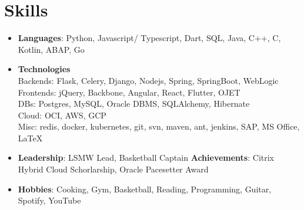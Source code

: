 \documentclass[letterpaper,11pt]{article}
\newcommand{\resumeSubHeadingListStart}{\begin{itemize}[leftmargin=*]}
\newcommand{\resumeSubHeadingListEnd}{\end{itemize}}
\begin{document}
\section{Skills}
 \resumeSubHeadingListStart
 \item{
     \textbf{Languages}{: Python, Javascript/ Typescript, Dart, SQL, Java, C++, C, Kotlin, ABAP, Go}
   }
   \vspace{-5pt}\item{
    \textbf{Technologies}{ \\Backends: Flask, Celery, Django, Nodejs, Spring, SpringBoot, WebLogic
    \\Frontends: jQuery, Backbone, Angular, React, Flutter, OJET
    \\DBs: Postgres, MySQL, Oracle DBMS, SQLAlchemy, Hibernate 
    \\Cloud: OCI, AWS, GCP
    \\Misc: redis, docker, kubernetes, git, svn, maven, ant, jenkins, SAP, MS Office, \LaTeX}
   }
   \vspace{-5pt}\item{
     \textbf{Leadership}{: LSMW Lead, Basketball Captain}
     \hfill
     \textbf{Achievements}{: Citrix Hybrid Cloud Schorlarship, Oracle Pacesetter Award}
   }
   \vspace{-5pt}\item{
    \textbf{Hobbies}{: Cooking, Gym, Basketball, Reading, Programming, Guitar, Spotify, YouTube}
   }      
 \resumeSubHeadingListEnd

\end{document}
